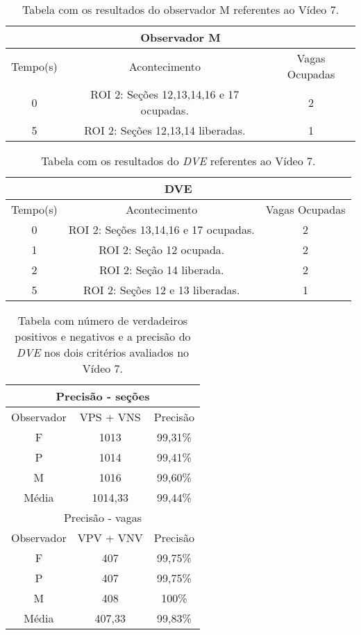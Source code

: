 \begin{table}[H]
\begin{center}
\begin{tabular}{|c||c||c|}
\hline
\multicolumn{3}{|c|}{Observador M}  \\ \hline \hline
Tempo(s) & Acontecimento & Vagas Ocupadas \\ \hline
0 & ROI 2: Seções 12,13,14,16 e 17 ocupadas. & 2 \\ \hline
5 & ROI 2: Seções 12,13,14 liberadas. & 1 \\ 
\hline
\end{tabular}
\end{center}
\caption{Tabela com os resultados do observador M referentes ao Vídeo 7.}
\label{tab:video7M}
\end{table}

\begin{table}[H]
\begin{center}
\begin{tabular}{|c||c||c|}
\hline
\multicolumn{3}{|c|}{DVE}  \\ \hline \hline
Tempo(s) & Acontecimento & Vagas Ocupadas \\ \hline
0 & ROI 2: Seções 13,14,16 e 17 ocupadas. & 2 \\ \hline
1 & ROI 2: Seção 12 ocupada. & 2 \\ \hline
2 & ROI 2: Seção 14 liberada. & 2 \\ \hline
5 & ROI 2: Seções 12 e 13 liberadas. & 1 \\
\hline
\end{tabular}
\end{center}
\caption{Tabela com os resultados do \textit{DVE} referentes ao Vídeo 7.}
\label{tab:video7}
\end{table}

\begin{table}[H]
\begin{center}
\begin{tabular}{|c||c||c|}
\hline
\multicolumn{3}{|c|}{Precisão - seções}  \\ \hline
Observador & VPS + VNS & Precisão \\ \hline
F & 1013 & 99,31\% \\  \hline
P & 1014 & 99,41\% \\ \hline
M & 1016 & 99,60\% \\ \hline
Média & 1014,33 & 99,44\% \\
\hline
\hline
\multicolumn{3}{|c|}{Precisão - vagas}  \\ \hline \hline
Observador & VPV + VNV & Precisão \\ \hline
F & 407 & 99,75\% \\  \hline
P & 407 & 99,75\% \\ \hline
M & 408 & 100\% \\ \hline
Média & 407,33 & 99,83\% \\
\hline
\end{tabular}
\end{center}
\caption{Tabela com número de verdadeiros positivos e negativos e a precisão do \textit{DVE} nos dois 
critérios avaliados no Vídeo 7.}
\label{tab:rvideo7}
\end{table}

